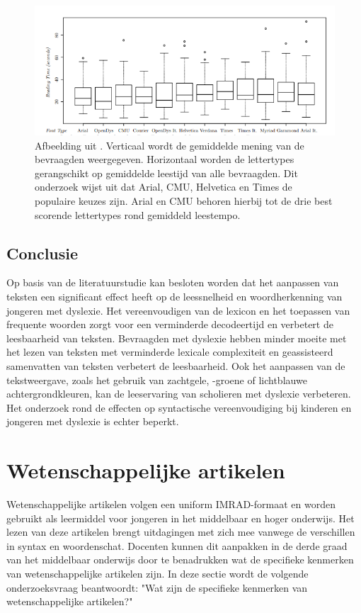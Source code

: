 \begin{figure}[H]
	\includegraphics{img/fonts-readability.png}
	\caption{Afbeelding uit \textcite{Rello2013b}. Verticaal wordt de gemiddelde mening van de bevraagden weergegeven. Horizontaal worden de lettertypes gerangschikt op gemiddelde leestijd van alle bevraagden. Dit onderzoek wijst uit dat Arial, CMU, Helvetica en Times de populaire keuzes zijn. Arial en CMU behoren hierbij tot de drie best scorende lettertypes rond gemiddeld leestempo.}
\end{figure}

\subsection{Conclusie}

Op basis van de literatuurstudie kan besloten worden dat het aanpassen van teksten een significant effect heeft op de leessnelheid en woordherkenning van jongeren met dyslexie. Het vereenvoudigen van de lexicon en het toepassen van frequente woorden zorgt voor een verminderde decodeertijd en verbetert de leesbaarheid van teksten. Bevraagden met dyslexie hebben minder moeite met het lezen van teksten met verminderde lexicale complexiteit en geassisteerd samenvatten van teksten verbetert de leesbaarheid. Ook het aanpassen van de tekstweergave, zoals het gebruik van zachtgele, -groene of lichtblauwe achtergrondkleuren, kan de leeservaring van scholieren met dyslexie verbeteren. Het onderzoek rond de effecten op syntactische vereenvoudiging bij kinderen en jongeren met dyslexie is echter beperkt.

\section{Wetenschappelijke artikelen}

Wetenschappelijke artikelen volgen een uniform IMRAD-formaat en worden gebruikt als leermiddel voor jongeren in het middelbaar en hoger onderwijs. Het lezen van deze artikelen brengt uitdagingen met zich mee vanwege de verschillen in syntax en woordenschat. Docenten kunnen dit aanpakken in de derde graad van het middelbaar onderwijs door te benadrukken wat de specifieke kenmerken van wetenschappelijke artikelen zijn. In deze sectie wordt de volgende onderzoeksvraag beantwoordt: "Wat zijn de specifieke kenmerken van wetenschappelijke artikelen?"

